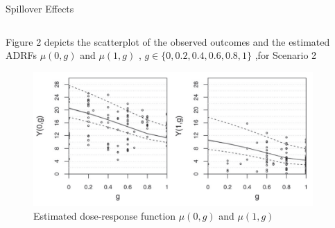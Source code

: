 \documentclass[notes,11pt, aspectratio=169]{beamer}
\begin{document}
\begin{frame}{Spillover Effects}
\begin{columns}[T] %
\begin{column}{\textwidth}
  \begin{wideitemize}
  \item Figure 2 depicts the scatterplot of the observed outcomes and the estimated ADRFs $\mu(0,g)$ and $\mu(1,g)$ , $g \in \{0,0.2,0.4,0.6,0.8,1\}$ ,for Scenario 2
   \begin{figure}[h]
   \centering
   \includegraphics[scale=0.6]{figure2.png}
   \caption{Estimated dose-response function $\mu(0,g)$ and $\mu(1,g)$}
   \label{fig:fig2}
   \end{figure}
  \end{wideitemize}
\end{column}%
\hfill%
\begin{column}{.38\textwidth}
  \vspace{20pt}
  \vspace{20pt}
\end{column}%
\end{columns}
\end{frame}
\end{document}
